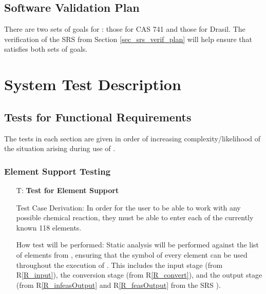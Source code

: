 \documentclass[12pt, titlepage]{article}
\newcounter{testnum} %
\newcommand{\rref}[1]{R\ref{#1}}
\begin{document}
\subsection{Software Validation Plan}

There are two sets of goals for \progname{}: those for CAS 741 and those for
Drasil. The verification of the SRS from Section \ref{sec_srs_verif_plan}
will help ensure that \progname{} satisfies both sets of goals.

 

\section{System Test Description} \label{sec_sys_tests}

\subsection{Tests for Functional Requirements} \label{sec_sysFunReqs}

The tests in each section are given in order of increasing
complexity/likelihood of the situation arising during use of \progname{}.

\subsubsection{Element Support Testing}

\begin{enumerate}

  \item[T\refstepcounter{testnum}\thetestnum \label{test_element_support}:]
    \textbf{Test for Element Support}

    Test Case Derivation: In order for the user to be able to work with any
    possible chemical reaction, they must be able to enter each of the
    currently known 118 elements.

    How test will be performed: Static analysis will be performed against the
    list of elements from \cite{helmenstine_list_2020}, ensuring that the
    symbol of every element can be used throughout the execution of
    \progname{}. This includes the input stage (from \rref{R_input}), the
    conversion stage (from \rref{R_convert}), and the output stage (from
    \rref{R_infeasOutput} and \rref{R_feasOutput} from the SRS \cite{srs}).

\end{enumerate}
\end{document}
